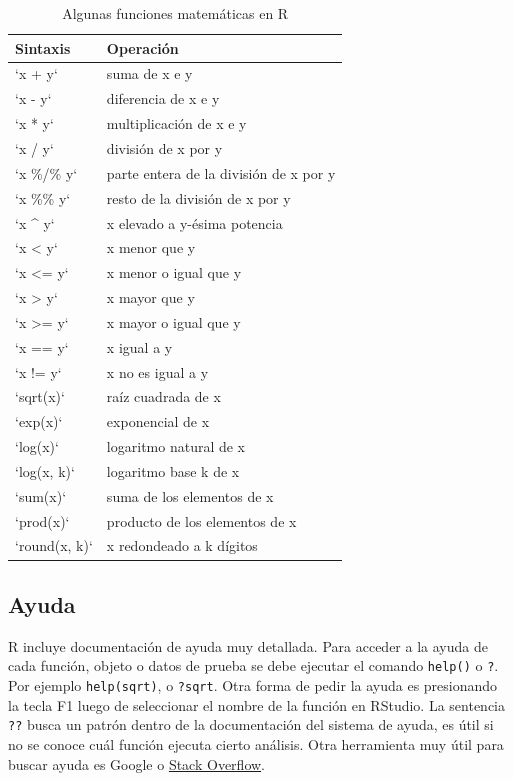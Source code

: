 \documentclass[
]{book}
\begin{document}
\begin{longtable}[t]{ll}
\caption{\label{tab:funcbasic}Algunas funciones matemáticas en R}\\
\toprule
Sintaxis & Operación\\
\midrule
`x + y` & suma de x e y\\
`x - y` & diferencia de x e y\\
`x * y` & multiplicación de x e y\\
`x / y` & división de x por y\\
`x \%/\% y` & parte entera de la división de x por y\\
\addlinespace
`x \%\% y` & resto de la división de x por y\\
`x \textasciicircum{} y` & x elevado a y-ésima potencia\\
`x < y` & x menor que y\\
`x <= y` & x menor o igual que y\\
`x > y` & x mayor que y\\
\addlinespace
`x >= y` & x mayor o igual que y\\
`x == y` & x igual a y\\
`x != y` & x no es igual a y\\
`sqrt(x)` & raíz cuadrada de x\\
`exp(x)` & exponencial de x\\
\addlinespace
`log(x)` & logaritmo natural de x\\
`log(x, k)` & logaritmo base k de x\\
`sum(x)` & suma de los elementos de x\\
`prod(x)` & producto de los elementos de x\\
`round(x, k)` & x redondeado a k dígitos\\
\bottomrule
\end{longtable}

\hypertarget{ayuda}{%
\subsection{Ayuda}\label{ayuda}}

R incluye documentación de ayuda muy detallada. Para acceder a la ayuda de cada
función, objeto o datos de prueba se debe ejecutar el comando \texttt{help()} o \texttt{?}.
Por ejemplo \texttt{help(sqrt)}, o \texttt{?sqrt}. Otra forma de pedir la ayuda es
presionando la tecla F1 luego de seleccionar el nombre de la función en RStudio.
La sentencia \texttt{??} busca un patrón dentro de la documentación del sistema de ayuda,
es útil si no se conoce cuál función ejecuta cierto análisis. Otra herramienta
muy útil para buscar ayuda es Google o \href{https://stackoverflow.com/}{Stack Overflow}.
\end{document}
